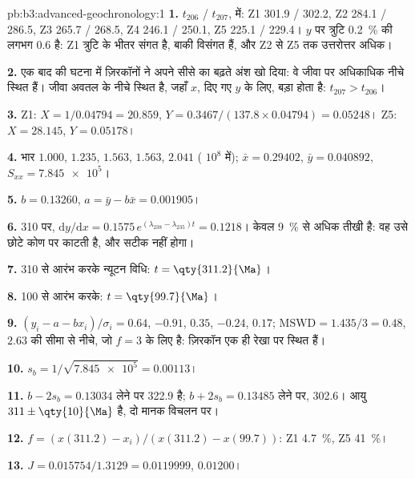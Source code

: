 \begin{solution}{pb:b3:advanced-geochronology:1}
\textbf{1.} $t_{206}$ / $t_{207}$, \unit{\Ma} में: Z1 301.9 / 302.2, Z2 284.1 /
286.5, Z3 265.7 / 268.5, Z4 246.1 / 250.1, Z5 225.1 / 229.4। $y$ पर त्रुटि
\qty{0.2}{\percent} की लगभग \qty{0.6}{\Ma} है: Z1 त्रुटि के भीतर संगत है,
बाकी विसंगत हैं, और Z2 से Z5 तक उत्तरोत्तर अधिक।

\textbf{2.} एक बाद की घटना में ज़िरकॉनों ने अपने सीसे का बढ़ते अंश
खो दिया: वे जीवा पर अधिकाधिक नीचे स्थित हैं। जीवा
अवतल  के नीचे स्थित है, जहाँ $x$, दिए गए $y$ के लिए, बड़ा होता है: $t_{207} > t_{206}$।

\textbf{3.} Z1: $X = 1/0.04794 = 20.859$, $Y = 0.3467/(137.8\times0.04794) =
0.05248$। Z5: $X = 28.145$, $Y = 0.05178$।

\textbf{4.} भार $1.000$, $1.235$, $1.563$, $1.563$, $2.041$ (
$10^8$ में); $\bar x = 0.29402$, $\bar y = 0.040892$, $S_{xx} = \num{7.845e5}$।

\textbf{5.} $b = 0.13260$, $a = \bar y - b\bar x = 0.001905$।

\textbf{6.} \qty{310}{\Ma} पर, $\mathrm dy/\mathrm dx = 0.1575\,
e^{(\lambda_{238} - \lambda_{235})t} = 0.1218$।  केवल
\qty{9}{\percent}  से अधिक तीखी है: वह उसे छोटे कोण पर काटती है,
और  सटीक नहीं होगा।

\textbf{7.} \qty{310}{\Ma} से आरंभ करके न्यूटन विधि: $t = \qty{311.2}{\Ma}$।

\textbf{8.} \qty{100}{\Ma} से आरंभ करके: $t = \qty{99.7}{\Ma}$।

\textbf{9.} $(y_i - a - bx_i)/\sigma_i = 0.64$, $-0.91$, $0.35$, $-0.24$,
$0.17$; $\mathrm{MSWD} = 1.435/3 = 0.48$, $2.63$ की सीमा से नीचे, जो $f = 3$ के लिए है:
ज़िरकॉन एक ही रेखा पर स्थित हैं।

\textbf{10.} $s_b = 1/\sqrt{\num{7.845e5}} = 0.00113$।

\textbf{11.} $b - 2s_b = 0.13034$ लेने पर 
\qty{322.9}{\Ma} है; $b + 2s_b = 0.13485$ लेने पर, \qty{302.6}{\Ma}। आयु
$311 \pm \qty{10}{\Ma}$ है, दो मानक विचलन पर।

\textbf{12.} $f = (x(311.2) - x_i)/(x(311.2) - x(99.7))$: Z1 \qty{4.7}{\percent},
Z5 \qty{41}{\percent}।

\textbf{13.} $J = 0.015754/1.3129 = 0.0119999$, $0.01200$।


\end{solution}
